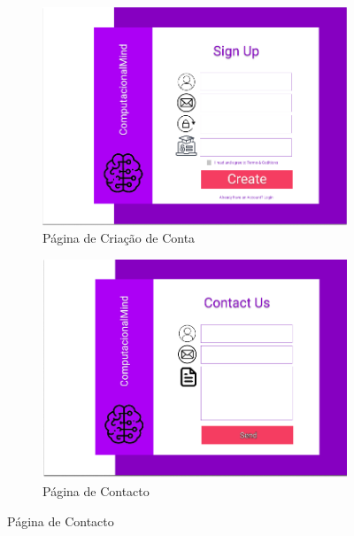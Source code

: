 \documentclass[11pt,a4paper]{report}
\begin{document}
\begin{figure}
     \centering
     \begin{subfigure}[b]{0.4\textwidth}
         \centering
         \includegraphics[width=\textwidth]{MockSingUp.png}
         \caption{Página de Criação de Conta}
         \label{fig:MockSingUp}
     \end{subfigure}
     \hfill
     \begin{subfigure}[b]{0.4\textwidth}
         \centering
         \includegraphics[width=\textwidth]{MockContactUs.png}
         \caption{Página de Contacto}
         \label{fig:MockContactUs}
     \end{subfigure}

\end{figure}
\end{document}
